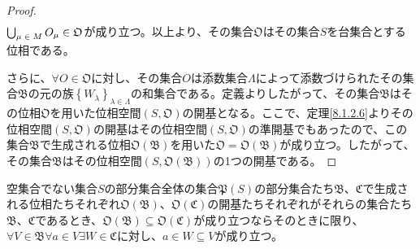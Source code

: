 \documentclass[dvipdfmx]{jsarticle}
\begin{document}
\begin{proof}
\begin{align*}
\end{align*}
$\bigcup_{\scriptsize \begin{matrix}
\mu \in M \\
\end{matrix}} O_{\mu}\in \mathfrak{O}$が成り立つ。以上より、その集合$\mathfrak{O}$はその集合$S$を台集合とする位相である。\par
さらに、$\forall O \in \mathfrak{O}$に対し、その集合$O$は添数集合$\varLambda$によって添数づけられたその集合$\mathfrak{B}$の元の族$\left\{ W_{\lambda} \right\}_{\lambda \in \varLambda}$の和集合である。定義よりしたがって、その集合$\mathfrak{B}$はその位相$\mathfrak{O}$を用いた位相空間$\left( S,\mathfrak{O} \right)$の開基となる。ここで、定理\ref{8.1.2.6}よりその位相空間$\left( S,\mathfrak{O} \right)$の開基はその位相空間$\left( S,\mathfrak{O} \right)$の準開基でもあったので、この集合$\mathfrak{B}$で生成される位相$\mathfrak{O}\left( \mathfrak{B} \right)$を用いた$\mathfrak{O} = \mathfrak{O}\left( \mathfrak{B} \right)$が成り立つ。したがって、その集合$\mathfrak{B}$はその位相空間$\left( S,\mathfrak{O}\left( \mathfrak{B} \right) \right)$の1つの開基である。
\end{proof}
\begin{thm}\label{8.1.2.10}
空集合でない集合$S$の部分集合全体の集合$\mathfrak{P}(S)$の部分集合たち$\mathfrak{B}$、$\mathfrak{C}$で生成される位相たちそれぞれ$\mathfrak{O}\left( \mathfrak{B} \right)$、$\mathfrak{O}\left( \mathfrak{C} \right)$の開基たちそれぞれがそれらの集合たち$\mathfrak{B}$、$\mathfrak{C}$であるとき、$\mathfrak{O}\left( \mathfrak{B} \right)\subseteq \mathfrak{O}\left( \mathfrak{C} \right)$が成り立つならそのときに限り、$\forall V \in \mathfrak{B\forall}a \in V\exists W\in \mathfrak{C}$に対し、$a \in W \subseteq V$が成り立つ。
\end{thm}
\end{document}
